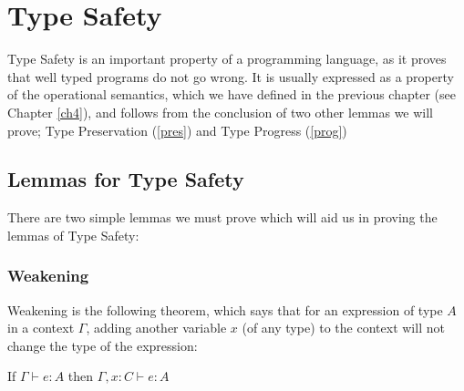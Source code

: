 \chapter{Type Safety}\label{safe}
Type Safety is an important property of a programming language, as it proves that well typed programs do not go wrong. It is usually expressed as a property of the operational semantics, which we have defined in the previous chapter (see Chapter \ref{ch4}), and follows from the conclusion of two other lemmas we will prove; Type Preservation (\ref{pres}) and Type Progress (\ref{prog})

\section{Lemmas for Type Safety}
There are two simple lemmas we must prove which will aid us in proving the lemmas of Type Safety:


\subsection{Weakening}\label{weak} 
Weakening is the following theorem, which says that for an expression of type $A$ in a context $\Gamma$, adding another variable $x$ (of any type) to the context will not change the type of the expression:

\vspace{0.5cm}

\begin{thm}
If $\Gamma \vdash e:A$ then  $\Gamma,x:C \vdash e:A$ 
\end{thm}
 

